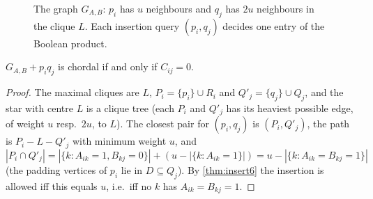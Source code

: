 \documentclass[11pt,a4paper,oneside]{report}
\theoremstyle{plain}
\theoremstyle{definition}
\theoremstyle{remark}
\begin{document}
\begin{figure}[ht]
\centering
{}
\caption[Reduction from Boolean matrix multiplication]{The graph \(G_{A,B}\): \(p_i\) has \(u\)
neighbours and \(q_j\) has \(2u\) neighbours in the clique \(L\). Each insertion query
\((p_i,q_j)\) decides one entry of the Boolean product.}
\label{fig:bmm}
\end{figure}

\begin{lemma}\label{lem:bmm-gadget}
\(G_{A,B}+p_iq_j\) is chordal if and only if \(C_{ij}=0\).
\end{lemma}
\begin{proof}
The maximal cliques are \(L\), \(P_i=\{p_i\}\cup R_i\) and \(Q'_j=\{q_j\}\cup Q_j\), and the star
with centre \(L\) is a clique tree (each \(P_i\) and \(Q'_j\) has its heaviest possible edge,
of weight \(u\) resp.\ \(2u\), to \(L\)). The closest pair for \((p_i,q_j)\) is
\((P_i,Q'_j)\), the path is \(P_i\!-\!L\!-\!Q'_j\) with minimum weight \(u\), and
\[ |P_i\cap Q'_j| = |\{k: A_{ik}=1, B_{kj}=0\}| + (u-|\{k:A_{ik}=1\}|) = u - |\{k: A_{ik}=B_{kj}=1\}| \]
(the padding vertices of \(p_i\) lie in \(D\subseteq Q_j\)). By \cref{thm:insert6} the insertion
is allowed iff this equals \(u\), i.e.\ iff no \(k\) has \(A_{ik}=B_{kj}=1\).
\end{proof}
\end{document}
